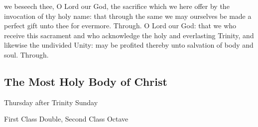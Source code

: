 \secret
{} we beseech thee, O Lord our God, the sacrifice which we here offer by the invocation of thy holy name: that through the same we may ourselves be made a perfect gift unto thee for evermore. Through.
%
\postcommunion
{} O Lord our God: that we who receive this sacrament and who acknowledge the holy and everlasting Trinity, and likewise the undivided Unity: may be profited thereby unto salvation of body and soul. Through.
%

\subsection{The Most Holy Body of Christ}
\begin{inhead}
	{Thursday after Trinity Sunday}\par
    {First Class Double, Second Class Octave}
\end{inhead}


